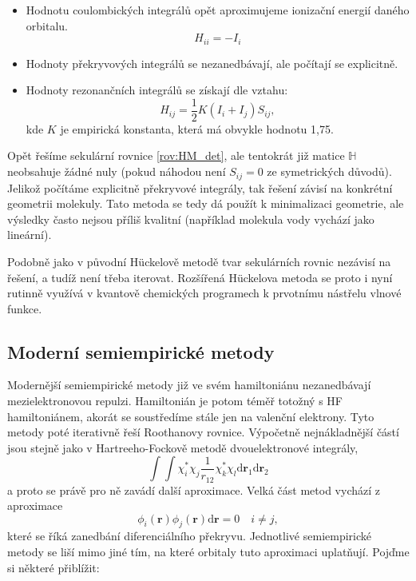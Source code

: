 \begin{itemize}
\item Hodnotu coulombických integrálů opět aproximujeme ionizační energií daného orbitalu.
$$H_{ii}=-I_i$$
\item Hodnoty překryvových integrálů se nezanedbávají, ale počítají se explicitně.
\item Hodnoty rezonančních integrálů se získají dle vztahu:
\begin{equation}
H_{ij}=\frac{1}{2}K(I_i+I_j)S_{ij},
\end{equation}
kde $K$ je empirická konstanta, která má obvykle hodnotu 1,75.
\end{itemize}
Opět řešíme sekulární rovnice \eqref{rov:HM_det}, ale tentokrát již matice $\mathbb{H}$ neobsahuje žádné nuly (pokud náhodou není $S_{ij}=0$ ze symetrických důvodů). Jelikož počítáme explicitně překryvové integrály, tak řešení závisí na konkrétní geometrii molekuly. Tato metoda se tedy dá použít k minimalizaci geometrie, ale výsledky často nejsou příliš kvalitní (například molekula vody vychází jako lineární).

Podobně jako v původní H\"{u}ckelově metodě tvar sekulárních rovnic nezávisí na řešení, a tudíž není třeba iterovat. Rozšířená H\"{u}ckelova metoda se proto i nyní rutinně využívá v kvantově chemických programech k prvotnímu nástřelu vlnové funkce.

\subsection{Moderní semiempirické metody}

Modernější semiempirické metody již ve svém hamiltoniánu nezanedbávají mezielektronovou repulzi.
Hamiltonián je potom téměř totožný s HF hamiltoniánem, akorát se soustředíme stále jen na valenční elektrony. Tyto metody poté iterativně řeší Roothanovy rovnice. Výpočetně nejnákladnější částí jsou stejně jako v Hartreeho-Fockově metodě dvouelektronové integrály,
\begin{equation}
\int \int \chi_i^*\chi_j\frac{1}{r_{12}}\chi_k^*\chi_l \mathrm{d}\textbf{r}_1\mathrm{d}\textbf{r}_2
\end{equation}
a proto se právě pro ně zavádí další aproximace. Velká část metod vychází z aproximace 
\begin{equation}
\phi_i(\mathbf{r}) \phi_j(\mathbf{r}) \mathrm{d}\mathbf{r} = 0 \quad i\neq j,
\label{rov:semiemp:4e}
\end{equation}
které se říká zanedbání diferenciálního překryvu. Jednotlivé semiempirické metody se liší mimo jiné tím, na které orbitaly tuto aproximaci uplatňují. Pojďme si některé přiblížit:

